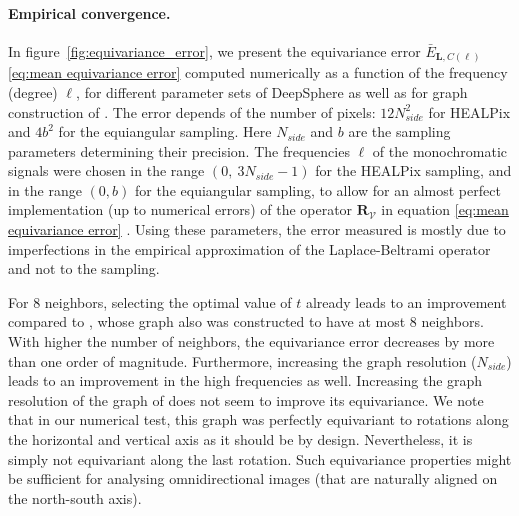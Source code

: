 \documentclass{article} %
\renewcommand{\b}[1]{{\bm{#1}}}  %
\newcommand{\V}{\mathcal{V}}  %
\newcommand{\figref}[1]{figure~\ref{fig:#1}}
\begin{document}
\paragraph{Empirical convergence.}

In \figref{equivariance_error}, we present the equivariance error $\bar{E}_{\b L,C(\ell)}$ \eqref{eq:mean equivariance error} computed numerically as a function of the frequency (degree) $\ell$, for different parameter sets of DeepSphere as well as for graph construction of \citet{khasanova2017sphericalcnn}.
The error depends of the number of pixels: $12N_{side}^2$ for HEALPix and $4b^2$ for the equiangular sampling. Here $N_{side}$ and $b$ are the sampling parameters determining their precision.
The frequencies $\ell$ of the monochromatic signals were chosen in the range $(0,\  3N_{side}-1)$ for the HEALPix sampling, and in the range $(0, b)$ for the equiangular sampling, to allow for an almost perfect implementation (up to numerical errors) of the operator $\b{R}_\V$ in equation \eqref{eq:mean equivariance error} \citep{gorski1999healpixprimer}.
Using these parameters, the error measured is mostly due to imperfections in the empirical approximation of the Laplace-Beltrami operator and not to the sampling.

For 8 neighbors, selecting the optimal value of $t$ already leads to an improvement compared to \citet{perraudin2019deepspherecosmo}, whose graph also was constructed to have at most 8 neighbors.
With higher the number of neighbors, the equivariance error decreases by more than one order of magnitude.
Furthermore, increasing the graph resolution ($N_{side}$) leads to an improvement in the high frequencies as well.
Increasing the graph resolution of the graph of \citet{khasanova2017sphericalcnn} does not seem to improve its equivariance. We note that in our numerical test, this graph was perfectly equivariant to rotations along the horizontal and vertical axis as it should be by design. Nevertheless, it is simply not equivariant along the last rotation. Such equivariance properties might be sufficient for analysing omnidirectional images (that are naturally aligned on the north-south axis).
\end{document}
